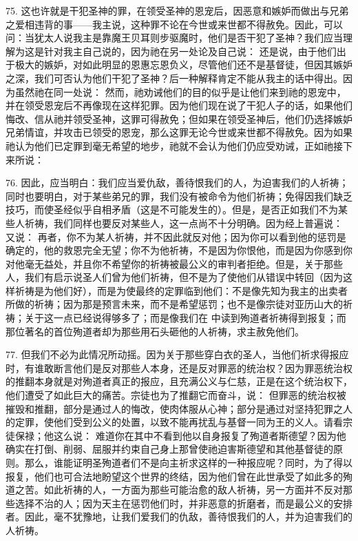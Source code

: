 75. 这也许就是干犯圣神的罪，在领受圣神的恩宠后，因恶意和嫉妒而做出与兄弟之爱相违背的事——我主说，这种罪不论在今世或来世都不得赦免。因此，可以问：当犹太人说我主是靠魔王贝耳则步驱魔时，他们是否干犯了圣神？我们应当理解为这是针对我主自己说的，因为祂在另一处论及自己说： 还是说，由于他们出于极大的嫉妒，对如此明显的恩惠忘恩负义，尽管他们还不是基督徒，但因其嫉妒之深，我们可否认为他们干犯了圣神？后一种解释肯定不能从我主的话中得出。因为虽然祂在同一处说： 然而，祂劝诫他们的目的似乎是让他们来到祂的恩宠中，并在领受恩宠后不再像现在这样犯罪。因为他们现在说了干犯人子的话，如果他们悔改、信从祂并领受圣神，这罪可得赦免；但如果在领受圣神后，他们仍选择嫉妒兄弟情谊，并攻击已领受的恩宠，那么这罪无论今世或来世都不得赦免。因为如果祂认为他们已定罪到毫无希望的地步，祂就不会认为他们仍应受劝诫，正如祂接下来所说：\par

76. 因此，应当明白：我们应当爱仇敌，善待恨我们的人，为迫害我们的人祈祷；同时也要明白，对于某些弟兄的罪，我们没有被命令为他们祈祷；免得因我们缺乏技巧，而使圣经似乎自相矛盾（这是不可能发生的）。但是，是否正如我们不为某些人祈祷，我们同样也要反对某些人，这一点尚不十分明确。因为经上普遍说： 又说： 再者，你不为某人祈祷，并不因此就反对他；因为你可以看到他的惩罚是确定的，他的救恩完全无望；你不为他祈祷，不是因为你恨他，而是因为你感到你对他毫无益处，并且你不希望你的祈祷被最公义的审判者拒绝。但是，关于那些人，我们有启示说圣人们曾为他们祈祷，但不是为了使他们从错误中转回（因为这样祈祷是为他们好），而是为使最终的定罪临到他们：不是像先知为我主的出卖者所做的祈祷；因为那是预言未来，而不是希望惩罚；也不是像宗徒对亚历山大的祈祷；关于这一点已经说得够多了；而是像我们在  中读到殉道者祈祷得到报复；而那位著名的首位殉道者却为那些用石头砸他的人祈祷，求主赦免他们。\par

77. 但我们不必为此情况所动摇。因为关于那些穿白衣的圣人，当他们祈求得报应时，有谁敢断言他们是反对那些人本身，还是反对罪恶的统治权？因为罪恶统治权的推翻本身就是对殉道者真正的报应，且充满公义与仁慈，正是在这个统治权下，他们遭受了如此巨大的痛苦。宗徒也为了推翻它而奋斗，说： 但罪恶的统治权被摧毁和推翻，部分是通过人的悔改，使肉体服从心神；部分是通过对坚持犯罪之人的定罪，使他们受到公义的处置，以致不能再扰乱与基督一同为王的义人。请看宗徒保禄；他这么说： 难道你在其中不看到他以自身报复了殉道者斯德望？因为他确实在打倒、削弱、屈服并约束自己身上那曾使祂迫害斯德望和其他基督徒的原则。那么，谁能证明圣殉道者们不是向主祈求这样的一种报应呢？同时，为了得以报复，他们也可合法地盼望这个世界的终结，因为他们曾在此世承受了如此多的殉道之苦。如此祈祷的人，一方面为那些可能治愈的敌人祈祷，另一方面并不反对那些选择不治的人；因为天主在惩罚他们时，并非恶意的折磨者，而是最公义的安排者。因此，毫不犹豫地，让我们爱我们的仇敌，善待恨我们的人，并为迫害我们的人祈祷。\par

